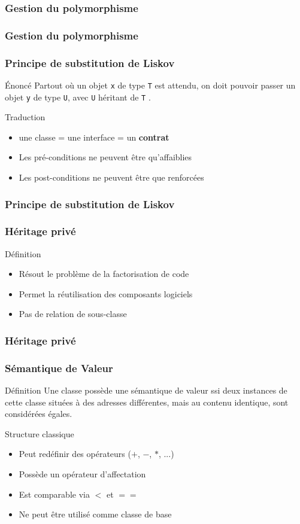 \documentclass[svgnames]{beamer}
\begin{document}
\frame
{
  \frametitle{Gestion du polymorphisme}
}

\frame
{
  \frametitle{Gestion du polymorphisme}
}

\frame
{
  \frametitle{Principe de substitution de Liskov}
  \begin{block}{\'Enonc\'e}
  Partout o\`u un objet \texttt{x} de type \texttt{T} est attendu, on doit pouvoir passer 
  un objet \texttt{y} de type \texttt{U}, avec \texttt{U}  héritant de \texttt{T} .
  \end{block}

  \begin{block}{Traduction}
  \begin{itemize}
  \item une classe = une interface = un \textbf{contrat}
  \item Les pr\'e-conditions ne peuvent \^etre qu'affaiblies
  \item Les post-conditions ne peuvent \^etre que renforcées
  \end{itemize}
  \end{block}
}

\frame
{
  \frametitle{Principe de substitution de Liskov}
}

\frame
{
  \frametitle{Héritage privé}
  \begin{block}{Définition}
  \begin{itemize}
  \item Résout le problème de la factorisation de code
  \item Permet la réutilisation des composants logiciels
  \item Pas de relation de sous-classe
  \end{itemize}

  \end{block}{}
}

\frame
{
  \frametitle{Héritage privé}
}

\frame
{
  \frametitle{Sémantique de Valeur }
  \begin{block}{Définition}
  Une classe possède une sémantique de valeur ssi deux instances de
  cette classe situées à des adresses différentes, mais au contenu
   identique, sont considérées égales.
  \end{block}

  \begin{block}{Structure classique}
  \begin{itemize}
  \footnotesize
  \item Peut redéfinir des opérateurs ($+$, $-$, $*$, ...)
  \item Possède un opérateur d'affectation
  \item Est comparable via $<$ et $==$
  \item Ne peut être utilisé comme classe de base
  \end{itemize}
  \end{block}
}
\end{document}
